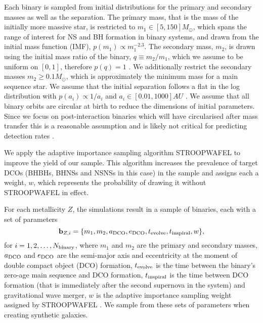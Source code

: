 Each binary is sampled from initial distributions for the primary and secondary masses as well as the separation. The primary mass, that is the mass of the initially more massive star, is restricted to $m_1 \in [5, 150] \unit{M_{\odot}}$, which spans the range of interest for NS and BH formation in binary systems, and drawn from the \citet{Kroupa+2001} initial mass function (IMF), $p(m_1) \propto m_1^{-2.3}$. The secondary mass, $m_2$, is drawn using the initial mass ratio of the binary, $q \equiv m_2 / m_1$, which we assume to be uniform on $[0, 1]$, therefore $p(q) = 1$ \citep[consistent e.g.\ with][]{Sana+2012}. We additionally restrict the secondary masses $m_2 \ge 0.1 \unit{M_{\odot}}$, which is approximately the minimum mass for a main sequence star. We assume that the initial separation follows a flat in the log distribution with $p(a_i) \propto 1 / a_i$ and $a_i \in [0.01, 1000] \unit{AU}$ \citep{Opik+1924, Abt+1983}. We assume that all binary orbits are circular at birth to reduce the dimensions of initial parameters. Since we focus on post-interaction binaries which will have circularised after mass transfer this is a reasonable assumption and is likely not critical for predicting detection rates \citep{Hurley+2002, deMink+2015}.

We apply the adaptive importance sampling algorithm STROOPWAFEL \citep{Broekgaarden+2019} to improve the yield of our sample. This algorithm increases the prevalence of target DCOs (BHBHs, BHNSs and NSNSs in this case) in the sample and assigns each a weight, $w$, which represents the probability of drawing it without STROOPWAFEL in effect.

For each metallicity $Z$, the simulations result in a sample of binaries, each with a set of parameters
\begin{equation}
    \mathbf{b}_{{Z, i}} = \{m_1, m_2, a_{\rm DCO}, e_{\rm DCO}, t_{\rm evolve}, t_{\rm inspiral}, w\},
\end{equation}
for $i = 1, 2, \dots, N_{\rm binary}$, where $m_1$ and $m_2$ are the primary and secondary masses, $a_{\rm DCO}$ and $e_{\rm DCO}$ are the semi-major axis and eccentricity at the moment of double compact object (DCO) formation, $t_{\rm evolve}$ is the time between the binary's zero-age main sequence and DCO formation, $t_{\rm inspiral}$ is the time between DCO formation (that is immediately after the second supernova in the system) and gravitational wave merger, $w$ is the adaptive importance sampling weight assigned by STROOPWAFEL \cite[][Eq.~7]{Broekgaarden+2019}. We sample from these sets of parameters when creating synthetic galaxies.

